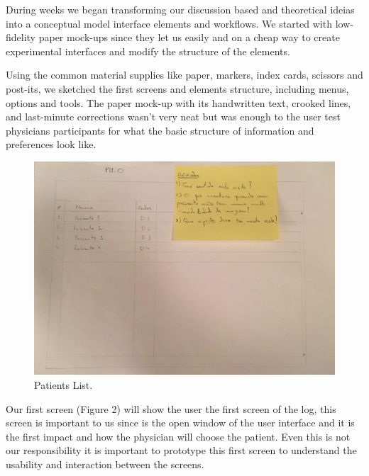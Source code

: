 During weeks we began transforming our discussion based and theoretical ideias into a conceptual model interface elements and workflows. We started with low-fidelity paper mock-ups since they let us easily and on a cheap way to create experimental interfaces and modify the structure of the elements.

Using the common material supplies like paper, markers, index cards, scissors and post-its, we sketched the first screens and elements structure, including menus, options and tools. The paper mock-up with its handwritten text, crooked lines, and last-minute corrections wasn't very neat but was enough to the user test physicians participants for what the basic structure of information and preferences look like.

\clearpage

\begin{figure}[!hbt]
\centering
\includegraphics[width=1.00\textwidth]{p110.png}
\caption{\label{fig:P 1.1.0}Patients List.
}
\end{figure}

Our first screen (Figure 2) will show the user the first screen of the log, this screen is important to us since is the open window of the user interface and it is the first impact and how the physician will choose the patient. Even this is not our responsibility it is important to prototype this first screen to understand the usability and interaction between the screens.

\clearpage

